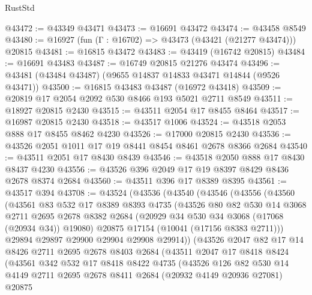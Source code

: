 \begin{lexlean}{RustStd}
\begin{coremodule}
@43472 := @43349 @43471
@43473 := @16691 @43472
@43474 := @43458 @8549
@43480 := @16927 (fun (Γ : @16702) => @43473 (@43421 (@21277 @43474))) @20815
@43481 := @16815 @43472
@43483 := @43419 (@16742 @20815)
@43484 := @16691 @43483
@43487 := @16749 @20815 @21276 @43474
@43496 := @43481 (@43484 @43487) (@9655 @14837 @14833 @43471 @14844 (@9526 @43471))
@43500 := @16815 @43483 @43487 (@16972 @43418)
@43509 := @20819 @17 @2054 @2092 @530 @8466 @193 @5021 @2711 @8549
@43511 := @18927 @20815 @2430
@43515 := @43511 @2054 @17 @8455 @8464
@43517 := @16987 @20815 @2430
@43518 := @43517 @1006
@43524 := @43518 @2053 @888 @17 @8455 @8462 @4230
@43526 := @17000 @20815 @2430
@43536 := @43526 @2051 @1011 @17 @19 @8441 @8454 @8461 @2678 @8366 @2684
@43540 := @43511 @2051 @17 @8430 @8439
@43546 := @43518 @2050 @888 @17 @8430 @8437 @4230
@43556 := @43526 @396 @2049 @17 @19 @8397 @8429 @8436 @2678 @8374 @2684
@43560 := @43511 @396 @17 @8389 @8395
@43561 := @43517 @394
@43708 := @43524
    (@43536
      (@43540
        (@43546
          (@43556
            (@43560
              (@43561
                @83
                @532
                @17
                @8389
                @8393
                @4735
                (@43526
                  @80
                  @82
                  @530
                  @14
                  @3068
                  @2711
                  @2695
                  @2678
                  @8382
                  @2684
                  (@20929 @34 @530 @34 @3068 (@17068 (@20934 @34)) @19080)
                  @20875
                  @17154
                  (@10041 (@17156 @8383 @2711)))
                @29894
                @29897
                @29900
                @29904
                @29908
                @29914))
            (@43526
              @2047
              @82
              @17
              @14
              @8426
              @2711
              @2695
              @2678
              @8403
              @2684
              (@43511
                @2047
                @17
                @8418
                @8424
                (@43561
                  @342
                  @532
                  @17
                  @8418
                  @8422
                  @4735
                  (@43526
                    @126
                    @82
                    @530
                    @14
                    @4149
                    @2711
                    @2695
                    @2678
                    @8411
                    @2684
                    (@20932 @4149 @20936 @27081)
                    @20875

\end{coremodule}
\end{lexlean}
